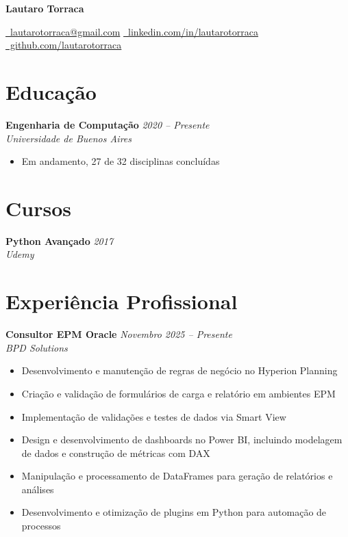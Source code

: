 \documentclass[10pt,a4paper]{article}
\newcommand{\cventry}[3]{%
  \textbf{#1} \hfill \textit{#3}\\[3pt]
  \textit{#2}%
}
\begin{document}
\begin{center}
  {\LARGE\bfseries Lautaro Torraca}

  \vspace{0.25cm}

  \href{mailto:lautarotorraca@gmail.com}
    {\faEnvelope\ lautarotorraca@gmail.com}
  \quad\textperiodcentered\quad
  \href{https://linkedin.com/in/lautarotorraca}
    {\faLinkedin\ linkedin.com/in/lautarotorraca}
  \quad\textperiodcentered\quad
  \href{https://github.com/lautarotorraca}
    {\faGithub\ github.com/lautarotorraca}
\end{center}

\section*{Educação}

\cventry{Engenharia de Computação}{Universidade de Buenos Aires}{2020 -- Presente}
\begin{itemize}[leftmargin=*, noitemsep, topsep=3pt, itemsep=2pt]
  \item Em andamento, 27 de 32 disciplinas concluídas
\end{itemize}

\section*{Cursos}

\cventry{Python Avançado}{Udemy}{2017}

\section*{Experiência Profissional}

\cventry{Consultor EPM Oracle}{BPD Solutions}{Novembro 2025 -- Presente}
\begin{itemize}[leftmargin=*, noitemsep, topsep=3pt, itemsep=2pt]
  \item Desenvolvimento e manutenção de regras de negócio no Hyperion Planning
  \item Criação e validação de formulários de carga e relatório em ambientes EPM
  \item Implementação de validações e testes de dados via Smart View
  \item Design e desenvolvimento de dashboards no Power BI, incluindo modelagem
        de dados e construção de métricas com DAX
  \item Manipulação e processamento de DataFrames para geração de relatórios
        e análises
  \item Desenvolvimento e otimização de plugins em Python para automação
        de processos
\end{itemize}
\end{document}

